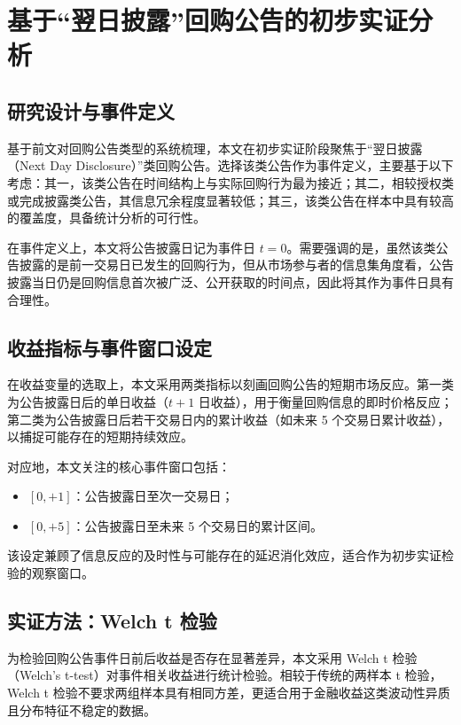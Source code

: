 \documentclass[a4paper,10pt]{article}
\begin{document}
\section{基于“翌日披露”回购公告的初步实证分析}

\subsection{研究设计与事件定义}

基于前文对回购公告类型的系统梳理，本文在初步实证阶段聚焦于“翌日披露（Next Day Disclosure）”类回购公告。选择该类公告作为事件定义，主要基于以下考虑：其一，该类公告在时间结构上与实际回购行为最为接近；其二，相较授权类或完成披露类公告，其信息冗余程度显著较低；其三，该类公告在样本中具有较高的覆盖度，具备统计分析的可行性。

在事件定义上，本文将公告披露日记为事件日 $t=0$。需要强调的是，虽然该类公告披露的是前一交易日已发生的回购行为，但从市场参与者的信息集角度看，公告披露当日仍是回购信息首次被广泛、公开获取的时间点，因此将其作为事件日具有合理性。

\subsection{收益指标与事件窗口设定}

在收益变量的选取上，本文采用两类指标以刻画回购公告的短期市场反应。第一类为公告披露日后的单日收益（$t+1$ 日收益），用于衡量回购信息的即时价格反应；第二类为公告披露日后若干交易日内的累计收益（如未来 5 个交易日累计收益），以捕捉可能存在的短期持续效应。

对应地，本文关注的核心事件窗口包括：
\begin{itemize}
    \item $[0, +1]$：公告披露日至次一交易日；
    \item $[0, +5]$：公告披露日至未来 5 个交易日的累计区间。
\end{itemize}

该设定兼顾了信息反应的及时性与可能存在的延迟消化效应，适合作为初步实证检验的观察窗口。


\subsection{实证方法：Welch t 检验}

为检验回购公告事件日前后收益是否存在显著差异，本文采用 Welch t 检验（Welch's t-test）对事件相关收益进行统计检验。相较于传统的两样本 t 检验，Welch t 检验不要求两组样本具有相同方差，更适合用于金融收益这类波动性异质且分布特征不稳定的数据。
\end{document}
